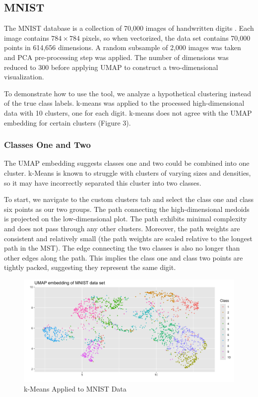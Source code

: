 \documentclass{article}
\begin{document}
\subsection{MNIST}
The MNIST database is a collection of 70,000 images of handwritten digits \cite{MNIST}. Each image contains $784 \times 784$ pixels, so when vectorized, the data set contains 70,000 points in 614,656 dimensions. A random subsample of 2,000 images was taken and PCA pre-processing step was applied. The number of dimensions was reduced to 300 before applying UMAP to construct a two-dimensional visualization.

 To demonstrate how to use the tool, we analyze a hypothetical clustering instead of the true class labels. k-means was applied to the processed high-dimensional data with 10 clusters,  one for each digit. k-means does not agree with the UMAP embedding for certain clusters (Figure 3).
 
\subsubsection{Classes One and Two}
The UMAP embedding suggests classes one and two could be combined into one cluster. k-Means is known to struggle with clusters of varying sizes and densities, so it may have incorrectly separated this cluster into two classes.

To start, we navigate to the custom clusters tab and select the class one and class six points as our two groups. The path connecting the high-dimensional medoids is projected on the low-dimensional plot. The path exhibits minimal complexity and does not pass through any other clusters. Moreover, the path weights are consistent and relatively small (the path weights are scaled relative to the longest path in the MST). The edge connecting the two classes is also no longer than other edges along the path. This implies the class one and class two points are tightly packed, suggesting they represent the same digit.
 
 \renewcommand{\figurename}{Figure}
\renewcommand{\thefigure}{3}
\begin{figure}[!t]
\centering
\includegraphics[scale=0.43]{MNIST kmeans}
\caption{k-Means Applied to MNIST Data}
\end{figure}
\end{document}
